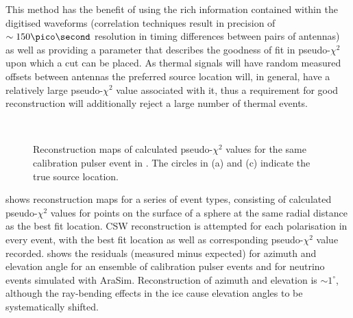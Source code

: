  This method has the benefit of using the rich information contained within the digitised waveforms (correlation techniques result in precision of $\sim 150 \pico \second$ resolution in timing differences between pairs of antennas) as well as providing a parameter that describes the goodness of fit in pseudo-$\chi^2$ upon which a cut can be placed. As thermal signals will have random measured offsets between antennas the preferred source location will, in general, have a relatively large pseudo-$\chi^2$ value associated with it, thus a requirement for good reconstruction will additionally reject a large number of thermal events.

\begin{figure}[htpb]
  \hfill
  \\
  \caption{Reconstruction maps of calculated pseudo-$\chi^{2}$ values for the same calibration pulser event in . The circles in (a) and (c) indicate the true source location.}
  \label{fig:analysis:Reconstruction:CSW-ChiSq-Example}
\end{figure}

 shows reconstruction maps for a series of event types, consisting of calculated pseudo-$\chi^{2}$ values for points on the surface of a sphere at the same radial distance as the best fit location. CSW reconstruction is attempted for each polarisation in every event, with the best fit location as well as corresponding pseudo-$\chi^{2}$ value recorded.  shows the residuals (measured minus expected) for azimuth and elevation angle for an ensemble of calibration pulser events and for neutrino events simulated with AraSim. Reconstruction of azimuth and elevation is $\sim 1^{\circ}$, although the ray-bending effects in the ice cause elevation angles to be systematically shifted. 


